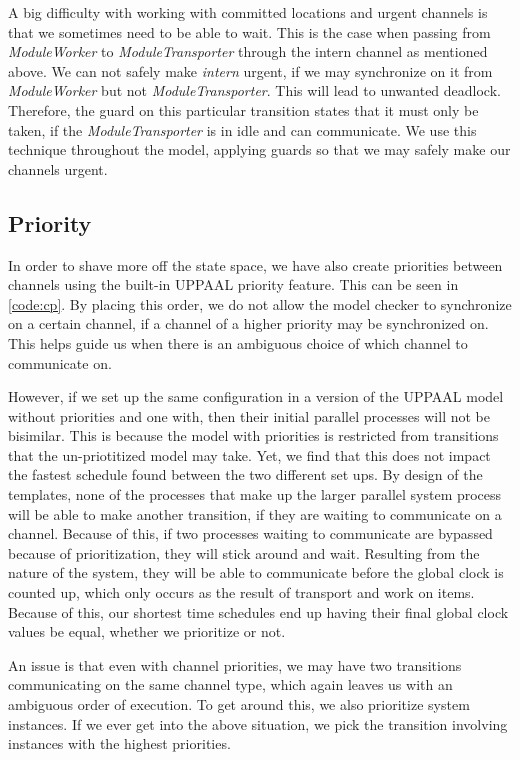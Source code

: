 A big difficulty with working with committed locations and urgent channels is that we sometimes need to be able to wait. This is the case when passing from \emph{ModuleWorker} to \emph{ModuleTransporter} through the intern channel as mentioned above. We can not safely make \emph{intern} urgent, if we may synchronize on it from \emph{ModuleWorker} but not \emph{ModuleTransporter}. This will lead to unwanted deadlock. Therefore, the guard on this particular transition states that it must only be taken, if the \emph{ModuleTransporter} is in idle and can communicate. We use this technique throughout the model, applying guards so that we may safely make our channels urgent. 

\subsection{Priority}
In order to shave more off the state space, we have also create priorities between channels using the built-in UPPAAL priority feature. This can be seen in \cref{code:cp}. By placing this order, we do not allow the model checker to synchronize on a certain channel, if a channel of a higher priority may be synchronized on. This helps guide us when there is an ambiguous choice of which channel to communicate on.

However, if we set up the same configuration in a version of the UPPAAL model without priorities and one with, then their initial parallel processes will not be bisimilar. This is because the model with priorities is restricted from transitions that the un-priotitized model may take. Yet, we find that this does not impact the fastest schedule found between the two different set ups. By design of the templates, none of the processes that make up the larger parallel system process will be able to make another transition, if they are waiting to communicate on a channel. Because of this, if two processes waiting to communicate are bypassed because of prioritization, they will stick around and wait. Resulting from the nature of the system, they will be able to communicate before the global clock is counted up, which only occurs as the result of transport and work on items. Because of this, our shortest time schedules end up having their final global clock values be equal, whether we prioritize or not.  

An issue is that even with channel priorities, we may have two transitions communicating on the same channel type, which again leaves us with an ambiguous order of execution. To get around this, we also prioritize system instances. If we ever get into the above situation, we pick the transition involving instances with the highest priorities. 

